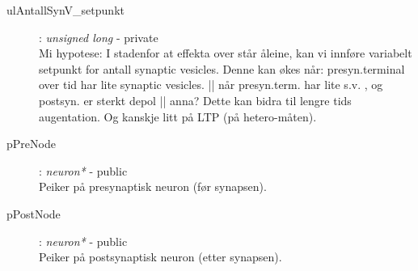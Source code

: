 \documentclass[norsk,11 pt]{report}
\begin{document}
\begin{description}

		\item[ulAntallSynV\_setpunkt] 			: 	\textit{unsigned long} 	- 	private \\
		Mi hypotese: I stadenfor at effekta over står åleine, kan vi innføre variabelt setpunkt for antall synaptic vesicles. Denne kan økes når:
		presyn.terminal over tid har lite synaptic vesicles. || når presyn.term. har lite s.v. , og postsyn. er sterkt depol || anna?
		Dette kan bidra til lengre tids augentation. Og kanskje litt på LTP (på hetero-måten).
		
		\item[pPreNode] 						: 	\textit{neuron*}  	-  	public \\
			Peiker på presynaptisk neuron (før synapsen).
		\item[pPostNode] 	 	 				: 	\textit{neuron*} 		-   	public \\
			Peiker på postsynaptisk neuron (etter synapsen).
	\end{description}
\end{document}
